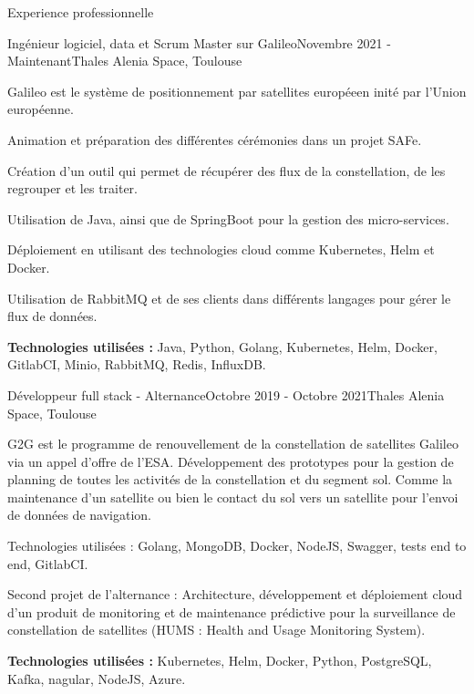 \documentclass[
	11pt, %
]{resume} %
\begin{document}

\begin{rSection}{Experience professionnelle}

	\begin{rSubsection}{Ingénieur logiciel, data et Scrum Master sur Galileo}{Novembre 2021 - Maintenant}{Thales Alenia Space, Toulouse}{}
 		\item Galileo est le système de positionnement par satellites européeen inité par l'Union européenne. 
		\item Animation et préparation des différentes cérémonies dans un projet SAFe.
		\item Création d'un outil qui permet de récupérer des flux de la constellation, de les regrouper et les traiter.
 		\item Utilisation de Java, ainsi que de SpringBoot pour la gestion des micro-services.
 		\item Déploiement en utilisant des technologies cloud comme Kubernetes, Helm et Docker.
 		\item Utilisation de RabbitMQ et de ses clients dans différents langages pour gérer le flux de données.
		\item \textbf{Technologies utilisées : }Java, Python, Golang, Kubernetes, Helm, Docker, GitlabCI, Minio, RabbitMQ, Redis, InfluxDB.
	\end{rSubsection}

	\begin{rSubsection}{Développeur full stack - Alternance}{Octobre 2019 - Octobre 2021}{Thales Alenia Space, Toulouse}{}
 		\item G2G est le programme de renouvellement de la constellation de satellites Galileo via un appel d'offre de l'ESA. 
			Développement des prototypes pour la gestion de planning de toutes les activités de la constellation et du segment sol. 
			Comme la maintenance d'un satellite ou bien le contact du sol vers un satellite pour l'envoi de données de navigation.
 		\item Technologies utilisées : Golang, MongoDB, Docker, NodeJS, Swagger, tests end to end, GitlabCI.
 		\item Second projet de l'alternance : Architecture, développement et déploiement cloud d'un produit de monitoring et de maintenance prédictive 
			pour la surveillance de constellation de satellites (HUMS : Health and Usage Monitoring System).
		\item \textbf{Technologies utilisées :} Kubernetes, Helm, Docker, Python, PostgreSQL, Kafka, nagular, NodeJS, Azure.
	\end{rSubsection}


\end{rSection}
\end{document}
